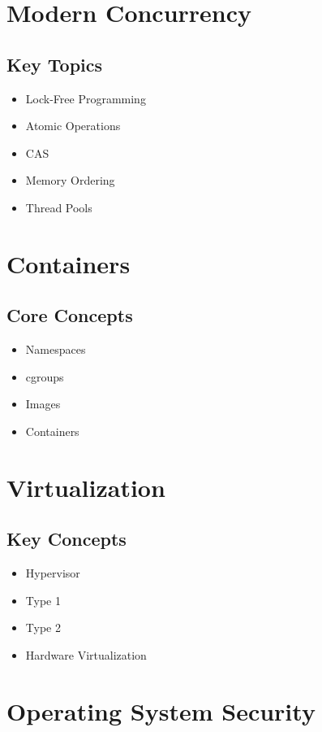 \section{Modern Concurrency}

\subsection*{Key Topics}

\begin{itemize}
\item Lock-Free Programming
\item Atomic Operations
\item CAS
\item Memory Ordering
\item Thread Pools
\end{itemize}

\section{Containers}

\subsection*{Core Concepts}

\begin{itemize}
\item Namespaces
\item cgroups
\item Images
\item Containers
\end{itemize}

\section{Virtualization}

\subsection*{Key Concepts}

\begin{itemize}
\item Hypervisor
\item Type 1
\item Type 2
\item Hardware Virtualization
\end{itemize}

\section{Operating System Security}

